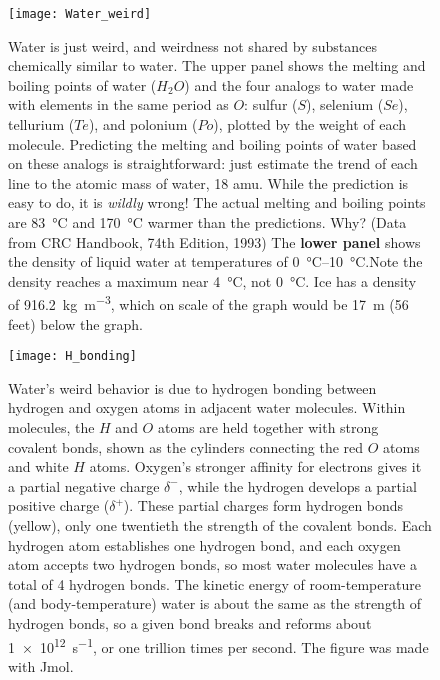 \documentclass[amstex,12pt]{book}
\begin{document}
{\newpage
\begin{figure}[p]
\centering
  \texttt{[image: Water\_weird]}%
\caption{Water is just weird, and weirdness not shared by substances chemically similar to water. The upper panel shows the melting and boiling points of water ($H_2O$) and the four analogs to water made with elements in the same period as $O$: sulfur ($S$), selenium ($Se$), tellurium ($Te$), and polonium ($Po$), plotted by the weight of each molecule. Predicting the melting and boiling points of water based on these analogs is straightforward: just estimate the trend of each line to the atomic mass of water, 18 amu. While the prediction is easy to do, it is \emph{wildly} wrong! The actual melting and boiling points are \SI{83}{\degreeCelsius} and \SI{170}{\degreeCelsius} warmer than the predictions. Why? (Data from CRC Handbook, 74th Edition, 1993) The \textbf{lower panel} shows the density of liquid water at temperatures of \SIrange{0}{10}{\degreeCelsius}.Note the density reaches a maximum near \SI{4}{\degreeCelsius}, not \SI{0}{\degreeCelsius}. Ice has a density of \SI{916.2}{\kilogram\per\metre^3}, which on scale of the graph would be \SI{17}{\metre} (56 feet) below the graph.}
\label{fig:wiw}
\end{figure}


\newpage
\begin{figure}[p]
\centering
  \texttt{[image: H\_bonding]}%
\caption{Water's weird behavior is due to hydrogen bonding between hydrogen and oxygen atoms in adjacent water molecules. Within molecules, the $H$ and $O$ atoms are held together with strong covalent bonds, shown as the cylinders connecting the red $O$ atoms and white $H$ atoms. Oxygen's stronger affinity for electrons gives it a partial negative charge $\delta^{-}$, while the hydrogen develops a partial positive charge ($\delta^{+}$). These partial charges form hydrogen bonds (yellow), only one twentieth the strength of the covalent bonds. Each hydrogen atom establishes one hydrogen bond, and each oxygen atom accepts two hydrogen bonds, so most water molecules have a total of 4 hydrogen bonds. The kinetic energy of room-temperature (and body-temperature) water is about the same as the strength of hydrogen bonds, so a given bond breaks and reforms about \SI{1e12}{s^{-1}}, or one trillion times per second. The figure was  made with Jmol.}
\label{fig:H_bonding}
\end{figure}

}
\end{document}
